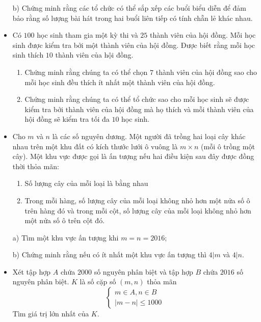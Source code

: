 \documentclass[11pt]{scrartcl}
\begin{document}
\begin{itemize}[label=, leftmargin=0em, itemsep=-0em]
\begin{btvn}
        b) Chứng minh rằng các tổ chức có thể sắp xếp các buổi biểu diễn để đảm bảo rằng số lượng bài hát trong hai buổi liên tiếp có tính chẵn lẻ khác nhau.
    \end{btvn}

    \item \begin{btvn}
    Có $100$ học sinh tham gia một kỳ thi và $25$ thành viên của hội đồng. Mỗi học sinh được kiểm tra bởi một thành viên của hội đồng. Được biết rằng mỗi học sinh thích $10$ thành viên của hội đồng.
    \begin{enumerate}[label=(\alph*)]
        \item Chứng minh rằng chúng ta có thể chọn $7$ thành viên của hội đồng sao cho mỗi học sinh đều thích ít nhất một thành viên của hội đồng.
        \item Chứng minh rằng chúng ta có thể tổ chức sao cho mỗi học sinh sẽ được kiểm tra bởi thành viên của hội đồng mà họ thích và mỗi thành viên của hội đồng sẽ kiểm tra tối đa $10$ học sinh.
    \end{enumerate}
    \end{btvn}

    \item \begin{btvn}
        Cho $m$ và $n$ là các số nguyên dương. Một người đã trồng hai loại cây khác nhau trên một khu đất có kích thước lưới ô vuông là $m \times n$ (mỗi ô trồng một cây). Một khu vực được gọi là ấn tượng nếu hai điều kiện sau đây được đồng thời thỏa mãn:
        \begin{enumerate}
            \item Số lượng cây của mỗi loại là bằng nhau
            \item Trong mỗi hàng, số lượng cây của mỗi loại không nhỏ hơn một nửa số ô trên hàng đó và trong mỗi cột, số lượng cây của mỗi loại không nhỏ hơn một nửa số ô trên cột đó.
        \end{enumerate}
        a) Tìm một khu vực ấn tượng khi $m=n=2016$;


        b) Chứng minh rằng nếu có ít nhất một khu vực ấn tượng thì $4|m$ và $4|n$.

    \end{btvn}

    \item \begin{btvn}
    Xét tập hợp $A$ chứa $2000$ số nguyên phân biệt và tập hợp $B$ chứa $2016$ số nguyên phân biệt. $K$ là số cặp số $(m, n)$ thỏa mãn
    \[ \begin{cases} m\in A, n\in B\\ |m-n|\leq 1000 \end{cases} \]
    Tìm giá trị lớn nhất của $K$.
    \end{btvn}


\end{itemize}
\end{document}
